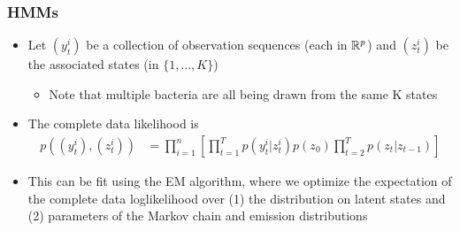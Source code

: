 \documentclass{beamer}
\begin{document}
\begin{frame}
  \frametitle{HMMs}
\begin{itemize}
\item Let $\left(y_{t}^{i}\right)$ be a collection of observation sequences
  (each in $\mathbb{R}^{p}$) and $\left(z_{t}^{i}\right)$ be the associated states
  (in $\{1, \dots, K\}$)
  \begin{itemize}
  \item Note that multiple bacteria are all being drawn from the same K states
  \end{itemize}
\item The complete data likelihood is
  \begin{align*}
    p\left(\left(y_{t}^{i}\right), \left(z_{t}^{i}\right)\right) &= \prod_{i = 1}^{n} \left[\prod_{t = 1}^{T} p\left(y_{t}^{i} \vert z_{t}^{i}\right) p\left(z_{0}\right)\prod_{t = 2}^{T} p\left(z_{t} \vert z_{t - 1}\right)\right]
  \end{align*}
\item This can be fit using the EM algorithm, where we optimize the expectation
  of the complete data loglikelihood over (1) the distribution on latent states
  and (2) parameters of the Markov chain and emission distributions
\end{itemize}  
\end{frame}



 
\end{document}
